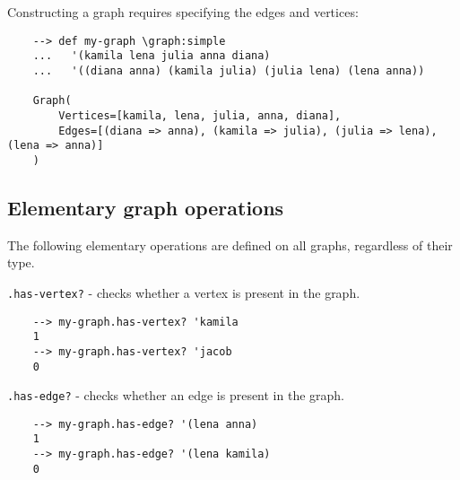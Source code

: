 \par \noindent Constructing a graph requires specifying the edges and vertices:

\begin{Verbatim}
    --> def my-graph \graph:simple 
    ...   '(kamila lena julia anna diana)
    ...   '((diana anna) (kamila julia) (julia lena) (lena anna))

    Graph(
        Vertices=[kamila, lena, julia, anna, diana],
        Edges=[(diana => anna), (kamila => julia), (julia => lena), (lena => anna)]
    )
\end{Verbatim}

\subsection{Elementary graph operations}

The following elementary operations are defined on all graphs, regardless of their type.
\newline

\par \noindent \verb|.has-vertex?| - checks whether a vertex is present in the graph.

\begin{Verbatim}
    --> my-graph.has-vertex? 'kamila
    1
    --> my-graph.has-vertex? 'jacob
    0
\end{Verbatim}

\par \noindent \verb|.has-edge?| - checks whether an edge is present in the graph.

\begin{Verbatim}
    --> my-graph.has-edge? '(lena anna)
    1
    --> my-graph.has-edge? '(lena kamila)
    0
\end{Verbatim}
